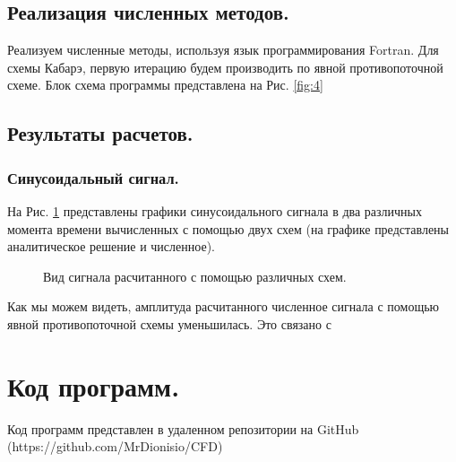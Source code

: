 \subsection{Реализация численных методов.}
Реализуем численные методы, используя язык программирования Fortran. Для схемы Кабарэ, первую итерацию будем производить по явной противопоточной схеме. Блок схема программы представлена на Рис. \ref{fig:4}
\subsection{Результаты расчетов.}
\subsubsection{Синусоидальный сигнал.}
На Рис. \ref{fig:11} представлены графики синусоидального сигнала в два различных момента времени вычисленных с помощью двух схем (на графике представлены аналитическое решение и численное).

\begin{figure}[H]
    \centering
    \hfill
    \hfill
    \caption{Вид сигнала расчитанного с помощью различных схем.}
    \label{fig:11}
\end{figure}

Как мы можем видеть, амплитуда расчитанного численное сигнала с помощью явной противопоточной схемы уменьшилась. Это связано с  

\section{Код программ.}
Код программ представлен в удаленном репозитории на GitHub \\ (https://github.com/MrDionisio/CFD)
